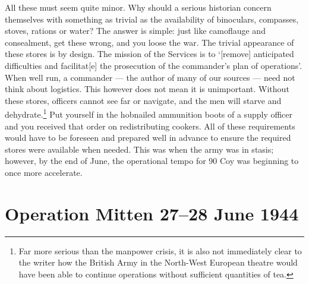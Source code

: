 \documentclass[noraggedright]{turabian-researchpaper}
\begin{document}
All these must seem quite minor.  Why should a serious historian concern 
themselves with something as trivial as the availability of binoculars, 
compasses, stoves, rations or water?  The answer is simple: just like 
camoflauge and consealment, get these wrong, 
and you loose the war.  The trivial appearance of these stores is by design.  
The mission of the Services is to `[remove] anticipated difficulties and 
facilitat[e] the prosecution of the commander's plan of operations'.\autocite
[s. 13(iv)]{FSR1}
When well run, a commander --- the author of many of our sources --- need
not think about logistics. This however does not mean it is unimportant. 
Without these stores, officers cannot see far or navigate, and the men will 
starve and dehydrate.\footnote
	{Far more serious than the manpower crisis, it is also not 
	immediately clear to the writer how the British Army in the 
	North-West European theatre would have been able to continue 
	operations without sufficient quantities of tea.}  
Put yourself in the hobnailed ammunition boots of a supply officer and
you received that order on redistributing cookers.  %
All of these requirements would have to be foreseen and 
prepared well in advance to ensure the required stores were available when
needed.  This was when the army was in stasis; however, by the end of
June, the operational tempo for 90 Coy was beginning to once more accelerate.

\section{Operation Mitten 27--28 June 1944}





\end{document}
